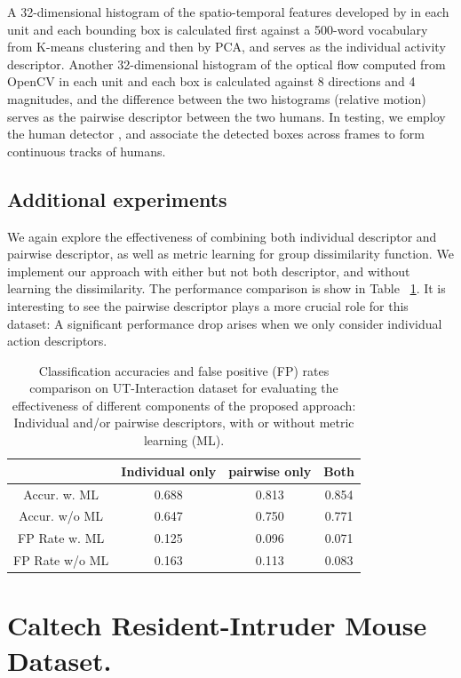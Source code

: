 \documentclass[10pt,twocolumn,letterpaper]{article}
\begin{document}
A 32-dimensional histogram of the spatio-temporal features developed by \cite{Dollar:STIP} in each unit and each bounding box is calculated first against a 500-word vocabulary from K-means clustering and then by PCA, and serves as the individual activity descriptor. Another 32-dimensional histogram of the optical flow computed from OpenCV in each unit and each box is calculated against 8 directions and 4 magnitudes, and the difference between the two histograms (relative motion) serves as the pairwise descriptor between the two humans. In testing, we employ the human detector \cite{Pedro:detect}, and associate the detected boxes across frames to form continuous tracks of humans. 

\subsection{Additional experiments}
We again explore the effectiveness of combining both individual descriptor and pairwise descriptor, as well as metric learning for group dissimilarity function. We implement our approach with either but not both descriptor, and without learning the dissimilarity. The performance comparison is show in Table ~\ref{UTaccuFPdegrade}. It is interesting to see the pairwise descriptor plays a more crucial role for this dataset: A significant performance drop arises when we only consider individual action descriptors. 

\begin{table}[h]
\centering \caption{Classification accuracies and false positive (FP) rates comparison on UT-Interaction dataset for evaluating the effectiveness of different components of the proposed approach: Individual and/or pairwise descriptors, with or without metric learning (ML).}
\footnotesize{
\begin{tabular}{|c|c|c|c|}
\hline   & Individual only & pairwise only & Both \\
\hline Accur. w. ML & 0.688 & 0.813 & 0.854  \\
\hline Accur. w/o ML & 0.647 & 0.750 & 0.771    \\
\hline FP Rate w. ML &  0.125 & 0.096 & 0.071  \\
\hline FP Rate w/o ML & 0.163 & 0.113 & 0.083\\
\hline 
\end{tabular}
}
\label{UTaccuFPdegrade}
\end{table}


\section{Caltech Resident-Intruder Mouse Dataset.} 
\end{document}
